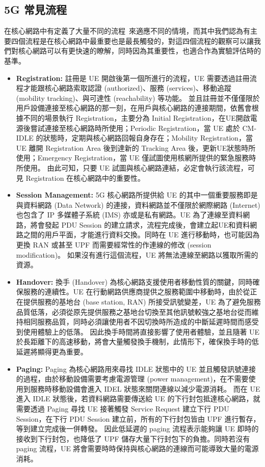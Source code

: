 \subsection{5G 常見流程}
\label{subsec:5g_procedure}

在核心網路中有定義了大量不同的流程~\cite{3gpp.23.502}來適應不同的情境，而其中我們認為有主要四個流程是在核心網路中最重要也是最長觸發的，對這四個流程的觀察可以讓我們對核心網路可以有更快速的瞭解，同時因為其重要性，也適合作為實驗評估時的基準。

\begin{itemize}
\item \textbf{Registration:}
    註冊是 UE 開啟後第一個所進行的流程，UE 需要透過註冊流程才能跟核心網路索取認證 (authorized)、服務 (services)、移動追蹤 (mobility tracking)、與可達性 (reachability) 等功能。
    並且註冊並不僅僅限於用戶設備連接至核心網路的那一刻，在用戶與核心網路的連接期間，依舊會根據不同的場景執行 Registration，主要分為 Initial Registration，在UE開啟電源後嘗試連接至核心網路時所使用；Periodic Registration，當 UE 處於 CM-IDLE 的狀態時，定期與核心網路回報自身存在；Mobility Registration，當 UE 離開 Registration Area 後到達新的 Tracking Area 後，更新UE狀態時所使用；Emergency Registration，當 UE 僅試圖使用核網所提供的緊急服務時所使用。
    由此可知，只要 UE 試圖與核心網路連結，必定會執行該流程，可見 Registration 在核心網路中的重要性。

\item \textbf{Session Management:}
    5G 核心網路所提供給 UE 的其中一個重要服務即是與資料網路 (Data Network) 的連接，資料網路並不僅限於網際網路 (Internet) 也包含了 IP 多媒體子系統 (IMS) 亦或是私有網路。UE 為了連線至資料網路，將會發起 PDU Session 的建立請求，流程完成後，會建立起UE和資料網路之間的用戶平面，才能進行資料交換。同時在 UE 進行移動時，也可能因為更換 RAN 或甚至 UPF 而需要經常性的作連線的修改 (session modification)。
    如果沒有進行這個流程，UE 將無法連線至網路以獲取所需的資源。

\item \textbf{Handover:}
    換手 (Handover) 為核心網路支援使用者移動性質的關鍵，同時確保服務的連續性。UE 在行動網路供應商提供之服務範圍中移動時，由於從正在提供服務的基地台 (base station, RAN) 所接受訊號變差，UE 為了避免服務品質低落，必須從原先提供服務之基地台切換至其他訊號較強之基地台從而維持相同服務品質，同時必須讓使用者不因切換時所造成的中斷延遲時間而感受到使用體驗上的低落。
    因此換手時間將直接影響了使用者體驗，並且隨著 UE 於長距離下的高速移動，將會大量觸發換手機制，此情形下，確保換手時的低延遲將顯得更為重要。

\item \textbf{Paging:}
    Paging 為核心網路用來尋找 IDLE 狀態中的 UE 並且觸發訊號連接的過程，由於移動設備需要考慮電源管理 (power management)，在不需要使用到服務時移動設備會進入 IDEL 狀態來關閉連線以減少電源消耗。
    而在 UE 進入 IDLE 狀態後，若資料網路需要傳送給 UE 的下行封包抵達核心網路，就需要透過 Paging 尋找 UE 接著觸發 Service Request 建立下行 PDU Session，在下行 PDU Session 建立前，所有的下行封包皆由 UPF 進行暫存，等到建立完成後一併轉發。
    因此低延遲的 paging 流程表示能夠讓 UE 即時的接收到下行封包，也降低了 UPF 儲存大量下行封包下的負擔。同時若沒有 paging 流程，UE 將會需要時時保持與核心網路的連線而可能導致大量的電源消耗。
\end{itemize}

